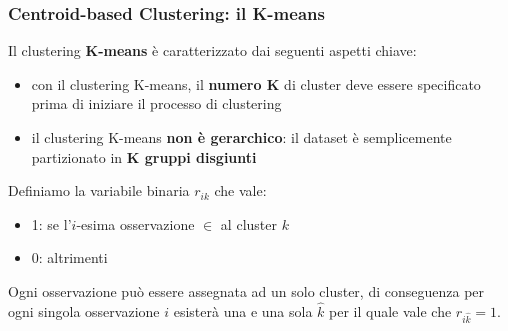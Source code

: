\begin{frame}

	\frametitle{{\color{GradientDescentDiagramBlue}Centroid-based Clustering}: il K-means}

		Il clustering \textbf{K-means} è caratterizzato dai seguenti aspetti chiave:
		\begin{itemize}
			\item con il clustering K-means, il \textbf{numero K} di cluster deve essere specificato prima di iniziare il processo di clustering
			\item il clustering K-means \textbf{non è gerarchico}: il dataset è semplicemente partizionato in \textbf{K gruppi disgiunti}
		\end{itemize}
		
		\pause
		\vspace{2em}
		Definiamo la variabile binaria $r_{ik}$ che vale:
		\begin{itemize}
			\item 1: se l'$i$-esima osservazione $\in$ al cluster $k$
			\item 0: altrimenti
		\end{itemize}
		Ogni osservazione può essere assegnata ad un solo cluster, di conseguenza per ogni singola osservazione $i$ esisterà una e una sola $\hat{k}$ per il quale vale che  $r_{i\hat{k}}=1$.


\end{frame}



